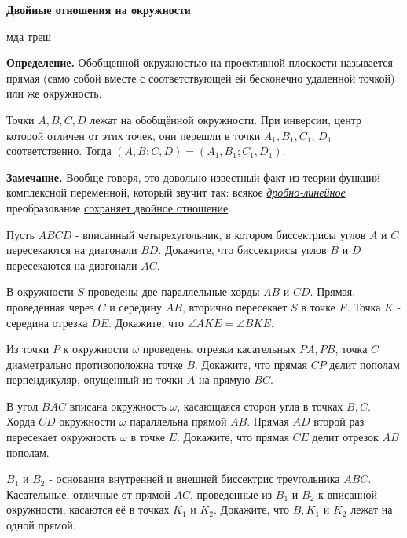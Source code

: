 \centerline{\bf \Huge Двойные отношения на окружности}

\begin{flushright}
        \scriptsize{мда треш}
\end{flushright}

\textbf{Определение.} Обобщенной окружностью на проективной плоскости называется прямая (само собой вместе с соответствующей ей бесконечно удаленной точкой) или же окружность.

Точки $A, B, C, D$ лежат на обобщённой окружности. При инверсии, центр которой отличен от этих точек, они перешли в точки $A_1, B_1, C_1$, $D_1$ соответственно. Тогда $(A, B ; C, D)=\left(A_1, B_1 ; C_1, D_1\right)$. 

\textbf{Замечание.} Вообще говоря, это довольно известный факт из теории функций комплексной переменной, который звучит так: всякое \hyperlink{https://ru.wikipedia.org/wiki/Дробно-линейное_преобразование_комплексной_плоскости}{\textit{дробно-линейное}} преобразование \hyperlink{https://old.mccme.ru/ium//postscript/f15/geometry-02-linfrac.pdf}{сохраняет двойное отношение}.

Пусть $A B C D$ - вписанный четырехугольник, в котором биссектрисы углов $A$ и $C$ пересекаются на диагонали $B D$. Докажите, что биссектрисы углов $B$ и $D$ пересекаются на диагонали $A C$.

В окружности $S$ проведены две параллельные хорды $A B$ и $C D$. Прямая, проведенная через $C$ и середину $A B$, вторично пересекает $S$ в точке $E$. Точка $K$ - середина отрезка $D E$. Докажите, что $\angle A K E=\angle B K E$.

Из точки $P$ к окружности $\omega$ проведены отрезки касательных $P A, P B$, точка $C$ диаметрально противоположна точке $B$. Докажите, что прямая $C P$ делит пополам перпендикуляр, опущенный из точки $A$ на прямую $B C$.

В угол $B A C$ вписана окружность $\omega$, касающаяся сторон угла в точках $B, C$. Хорда $C D$ окружности $\omega$ параллельна прямой $A B$. Прямая $A D$ второй раз пересекает окружность $\omega$ в точке $E$. Докажите, что прямая $C E$ делит отрезок $A B$ пополам.

$B_1$ и $B_2$ - основания внутренней и внешней биссектрис треугольника $A B C$. Касательные, отличные от прямой $A C$, проведенные из $B_1$ и $B_2$ к вписанной окружности, касаются её в точках $K_1$ и $K_2$. Докажите, что $B, K_1$ и $K_2$ лежат на одной прямой.

